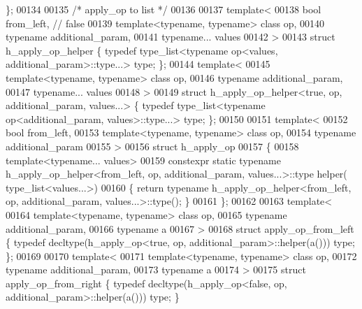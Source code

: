 \begin{DoxyCode}
       \};
00134 
00135 \textcolor{comment}{/* apply\_op to list */}
00136 
00137 \textcolor{keyword}{template}<
00138   \textcolor{keywordtype}{bool} from\_left, \textcolor{comment}{// false}
00139   \textcolor{keyword}{template}<\textcolor{keyword}{typename}, \textcolor{keyword}{typename}> \textcolor{keyword}{class }op,
00140   \textcolor{keyword}{typename} additional\_param,
00141   \textcolor{keyword}{typename}... values
00142 >
00143 \textcolor{keyword}{struct }h\_apply\_op\_helper                                        \{ \textcolor{keyword}{typedef} type\_list<typename op<values,
       additional\_param>::type...> type; \};
00144 \textcolor{keyword}{template}<
00145   \textcolor{keyword}{template}<\textcolor{keyword}{typename}, \textcolor{keyword}{typename}> \textcolor{keyword}{class }op,
00146   \textcolor{keyword}{typename} additional\_param,
00147   \textcolor{keyword}{typename}... values
00148 >
00149 \textcolor{keyword}{struct }h\_apply\_op\_helper<true, op, additional\_param, values...> \{ \textcolor{keyword}{typedef} type\_list<typename
       op<additional\_param, values>::type...> type; \};
00150 
00151 \textcolor{keyword}{template}<
00152   \textcolor{keywordtype}{bool} from\_left,
00153   \textcolor{keyword}{template}<\textcolor{keyword}{typename}, \textcolor{keyword}{typename}> \textcolor{keyword}{class }op,
00154   \textcolor{keyword}{typename} additional\_param
00155 >
00156 \textcolor{keyword}{struct }h\_apply\_op
00157 \{
00158   \textcolor{keyword}{template}<\textcolor{keyword}{typename}... values>
00159   constexpr \textcolor{keyword}{static} \textcolor{keyword}{typename} h\_apply\_op\_helper<from\_left, op, additional\_param, values...>::type helper(
      type\_list<values...>)
00160   \{ \textcolor{keywordflow}{return} \textcolor{keyword}{typename} h\_apply\_op\_helper<from\_left, op, additional\_param, values...>::type(); \}
00161 \};
00162 
00163 \textcolor{keyword}{template}<
00164   \textcolor{keyword}{template}<\textcolor{keyword}{typename}, \textcolor{keyword}{typename}> \textcolor{keyword}{class }op,
00165   \textcolor{keyword}{typename} additional\_param,
00166   \textcolor{keyword}{typename} a
00167 >
00168 \textcolor{keyword}{struct }apply\_op\_from\_left \{ \textcolor{keyword}{typedef} decltype(h\_apply\_op<true, op, additional\_param>::helper(a())) type; \};
00169 
00170 template<
00171   template<typename, typename> class op,
00172   typename additional\_param,
00173   typename a
00174 >
00175 struct apply\_op\_from\_right \{ \textcolor{keyword}{typedef} decltype(h\_apply\_op<false, op, additional\_param>::helper(a())) type; \}

\end{DoxyCode}
